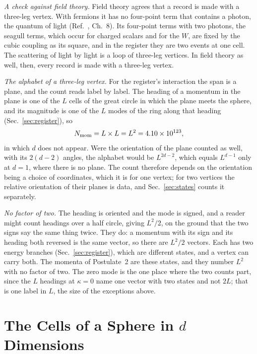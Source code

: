 \documentclass[aps,prd,twocolumn,superscriptaddress,nofootinbib]{revtex4-2}
\begin{document}
\textit{A check against field theory.} Field theory agrees that a record is made with a three-leg vertex. With fermions it has no four-point term that contains a photon, the quantum of light (Ref.~\cite{weinberg1995}, Ch.~8). Its four-point terms with two photons, the seagull terms, which occur for charged scalars and for the $W$, are fixed by the cubic coupling as its square, and in the register they are two events at one cell. The scattering of light by light is a loop of three-leg vertices. In field theory as well, then, every record is made with a three-leg vertex.

\textit{The alphabet of a three-leg vertex.} For the register's interaction the span is a plane, and the count reads label by label. The heading of a momentum in the plane is one of the $L$ cells of the great circle in which the plane meets the sphere, and its magnitude is one of the $L$ modes of the ring along that heading (Sec.~\ref{sec:register}), so
\begin{equation}
N_{\rm mom} = L\times L = L^2 = 4.10\times10^{123},
\label{eq:demand}
\end{equation}
in which $d$ does not appear. Were the orientation of the plane counted as well, with its $2(d-2)$ angles, the alphabet would be $L^{2d-2}$, which equals $L^{d-1}$ only at $d = 1$, where there is no plane. The count therefore depends on the orientation being a choice of coordinates, which it is for one vertex; for two vertices the relative orientation of their planes is data, and Sec.~\ref{sec:states} counts it separately.

\textit{No factor of two.} The heading is oriented and the mode is signed, and a reader might count headings over a half circle, giving $L^2/2$, on the ground that the two signs say the same thing twice. They do: a momentum with its sign and its heading both reversed is the same vector, so there are $L^2/2$ vectors. Each has two energy branches (Sec.~\ref{sec:register}), which are different states, and a vertex can carry both. The momenta of Postulate~2 are these states, and they number $L^2$ with no factor of two. The zero mode is the one place where the two counts part, since the $L$ headings at $\kappa = 0$ name one vector with two states and not $2L$; that is one label in $L$, the size of the exceptions above.

\section{The Cells of a Sphere in $d$ Dimensions}
\label{sec:supply}
\end{document}
